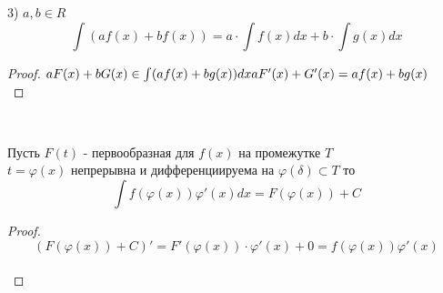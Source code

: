 3) $a, b \in R$\\
\[\int (af(x) + bf(x)) = a \cdot \int f(x)dx + b \cdot \int g(x)dx\]
\begin{proof}
  $aF(x) + bG(x) \in \int (af(x) + bg(x))dx\\
  aF'(x) + G'(x) = af(x) + bg(x)$ \\
\end{proof}

\begin{center}
  \\
\end{center}

\begin{theorem}
  Пусть $F(t)$ - первообразная для $f(x)$ на промежутке $T$ \\
  $t = \varphi (x)$ непрерывна и дифференциируема на $\varphi(\delta) \subset T$
  то\\
  \[\int f(\varphi (x)) \varphi'(x)dx = F(\varphi (x)) + C\]
\end{theorem}

\begin{proof}
  \[(F(\varphi(x)) + C)' = F'(\varphi (x)) \cdot \varphi'(x) + 0 = f(\varphi(x))
  \varphi'(x)\]\\
\end{proof}